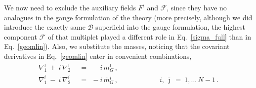 \documentclass[12pt]{article}
\newcommand{\ov}{\overline}
\newcommand{\mc}[1]{\mathcal{#1}}
\newcommand{\ff}{\mc{F}}
\newcommand{\bj}{{\bar \jmath}}
\begin{document}
	We now need to exclude the auxiliary fields $ F^i $ and $ \ff $, since they have no analogues
	in the gauge formulation of the theory 
	(more precisely, although we did introduce the exactly same $\mc{B}$ superfield into the gauge formulation, 
	the highest component $\ff$ of that multiplet played a different role in Eq.~\eqref{sigma_full} than in Eq.~\eqref{geomlin}).
	Also, we substitute the masses, noticing that the covariant derivatives in Eq.~\eqref{geomlin} 
	enter in convenient combinations, 
\begin{align*}
%
	\nabla_1^\bj ~+~ i\,\nabla_2^\bj & ~~=~~ \phantom{-} i\,m_G^\bj\,,    \\
%
	\nabla_1^i ~-~ i\,\nabla_2^i     & ~~=~~ -i\,\ov{m}{}_G^i\,,
	\qquad\qquad\qquad i,\,\bj ~=~ 1,...\,N-1\,.
\end{align*}
\end{document}
